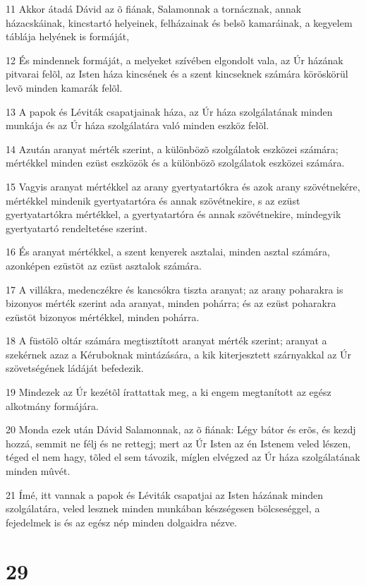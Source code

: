 \par 11 Akkor átadá Dávid az õ fiának, Salamonnak a tornácznak, annak házacskáinak, kincstartó helyeinek, felházainak és belsõ kamaráinak, a kegyelem táblája helyének is formáját,
\par 12 És mindennek formáját, a melyeket szívében elgondolt vala, az Úr házának pitvarai felõl, az Isten háza kincsének és a szent kincseknek számára köröskörül levõ minden kamarák felõl.
\par 13 A papok és Léviták csapatjainak háza, az Úr háza szolgálatának minden munkája és az Úr háza szolgálatára való minden eszköz felõl.
\par 14 Azután aranyat mérték szerint, a különbözõ szolgálatok eszközei számára; mértékkel minden ezüst eszközök és a különbözõ szolgálatok eszközei számára.
\par 15 Vagyis aranyat mértékkel az arany gyertyatartókra és azok arany szövétnekére, mértékkel mindenik gyertyatartóra és annak szövétnekire, s az ezüst gyertyatartókra mértékkel, a gyertyatartóra és annak szövétnekire, mindegyik gyertyatartó rendeltetése szerint.
\par 16 És aranyat mértékkel, a szent kenyerek asztalai, minden asztal számára, azonképen ezüstöt az ezüst asztalok számára.
\par 17 A villákra, medenczékre és kancsókra tiszta aranyat; az arany poharakra is bizonyos mérték szerint ada aranyat, minden pohárra; és az ezüst poharakra ezüstöt bizonyos mértékkel, minden pohárra.
\par 18 A füstölõ oltár számára megtisztított aranyat mérték szerint; aranyat a szekérnek azaz a  Kéruboknak mintázására, a kik kiterjesztett szárnyakkal az Úr szövetségének ládáját befedezik.
\par 19 Mindezek az Úr kezétõl írattattak meg, a ki engem megtanított az egész alkotmány formájára.
\par 20 Monda ezek után Dávid Salamonnak, az õ fiának: Légy bátor és erõs, és kezdj hozzá, semmit ne félj és ne rettegj; mert az Úr Isten az én Istenem veled lészen, téged el nem hagy, tõled el sem távozik, míglen elvégzed az Úr háza szolgálatának minden  mûvét.
\par 21 Ímé, itt vannak a papok és Léviták csapatjai az Isten házának minden szolgálatára, veled lesznek minden munkában készségesen bölcseséggel, a fejedelmek is és az egész nép minden dolgaidra nézve.

\chapter{29}

